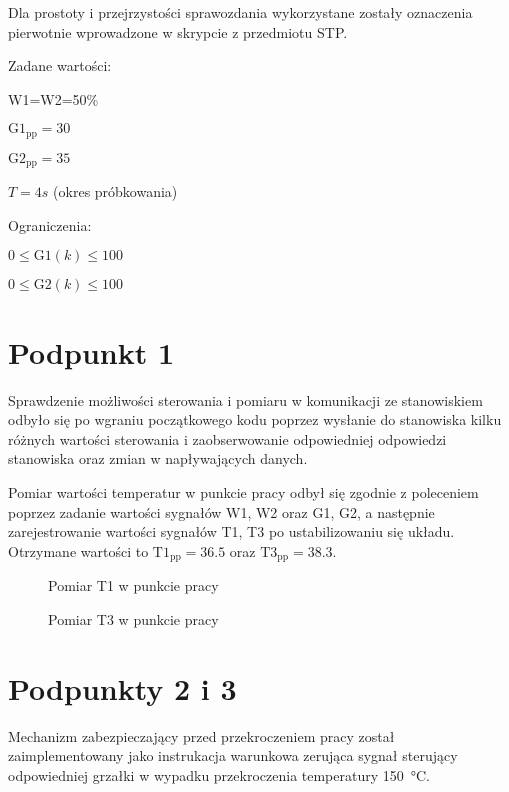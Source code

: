 \bigskip

\bigskip

Dla prostoty i przejrzystości sprawozdania wykorzystane zostały oznaczenia pierwotnie wprowadzone w skrypcie z przedmiotu STP.

\bigskip

Zadane wartości:

\smallskip

W1=W2=50\%

\smallskip

$\mathrm{G1_{pp}}=30$

\smallskip

$\mathrm{G2_{pp}}=35$

\smallskip

$T=4s$ (okres próbkowania)

\bigskip

Ograniczenia:

\smallskip

$0 \le \mathrm{G1}(k) \le 100$

$0 \le \mathrm{G2}(k) \le 100$

\chapter{Podpunkt 1}
Sprawdzenie możliwości sterowania i pomiaru w komunikacji ze stanowiskiem odbyło się po wgraniu początkowego kodu poprzez wysłanie do stanowiska kilku różnych wartości sterowania i zaobserwowanie odpowiedniej odpowiedzi stanowiska oraz zmian w napływających danych.

Pomiar wartości temperatur w punkcie pracy odbył się zgodnie z poleceniem poprzez zadanie wartości sygnałów W1, W2 oraz G1, G2, a następnie zarejestrowanie wartości sygnałów T1, T3 po ustabilizowaniu się układu. Otrzymane wartości to $\mathrm{T1_{pp}}=\num{36,5}$ oraz $\mathrm{T3_{pp}}=\num{38,3}$.

\begin{figure}[ht]
\centering

\caption{Pomiar T1 w punkcie pracy}
\label{Z1T1}
\end{figure}

\begin{figure}[ht]
\centering

\caption{Pomiar T3 w punkcie pracy}
\label{Z1T3}
\end{figure}

\chapter{Podpunkty 2 i 3}
Mechanizm zabezpieczający przed przekroczeniem pracy został zaimplementowany jako instrukacja warunkowa zerująca sygnał sterujący odpowiedniej grzałki w wypadku przekroczenia temperatury \SI{150}{\celsius}.

